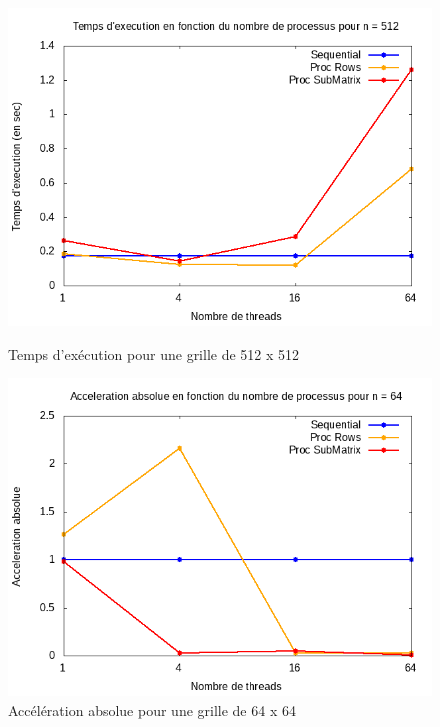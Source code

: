 \documentclass[10pt,a4paper]{article}
\begin{document}
\begin{figure}[h]
  \centering
  \begin{minipage}[b]{0.49\textwidth}
	\includegraphics[width=\textwidth]{./Time/size_512_time.png}
    \caption{Temps d'exécution pour une grille de 512 x 512}
  \end{minipage}
  \hfill
  \begin{minipage}[b]{0.49\textwidth}
    \includegraphics[width=\textwidth]{./Time/size_64_acceleration.png}
    \caption{Accélération absolue pour une grille de 64 x 64}
  \end{minipage}
\end{figure}
\end{document}

